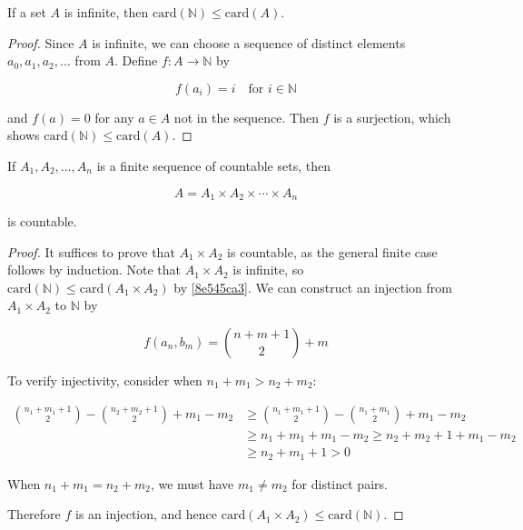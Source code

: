 \begin{thm}\label{8e545ca3}
    If a set $A$ is infinite, then $\mathrm{card}(\mathbb{N}) \le \mathrm{card}(A)$.
\end{thm}

\begin{proof}
    Since $A$ is infinite, we can choose a sequence of distinct elements $a_0,a_1,a_2,\ldots$ from $A$. 
    Define $f: A \to \mathbb{N}$ by

    \[
        f(a_i) = i \quad \text{for } i \in \mathbb{N}
    \]
    
    and $f(a) = 0$ for any $a \in A$ not in the sequence. Then $f$ is a surjection, 
    which shows $\mathrm{card}(\mathbb{N}) \le \mathrm{card}(A)$.
\end{proof}

\begin{thm}
    If $A_1,A_2,\ldots, A_n$ is a finite sequence of countable sets, then

    \[
        A = A_1 \times A_2 \times \cdots \times A_n
    \]

    is countable.
\end{thm}

\begin{proof}
    It suffices to prove that $A_1 \times A_2$ is countable, as the general finite case follows by induction.
    Note that $A_1 \times A_2$ is infinite, so $\mathrm{card}(\mathbb{N}) \le \mathrm{card}(A_1 \times A_2)$ by \cref{8e545ca3}.
    We can construct an injection from $A_1 \times A_2$ to $\mathbb{N}$ by

    \[
        f(a_n, b_m) = \binom{n+m + 1}{2} + m
    \]

    To verify injectivity, consider when $n_1 + m_1 > n_2 + m_2$:

    \begin{align*}
        \binom{n_1 + m_1 + 1}{2} -\binom{n_2 + m_2 + 1}{2} + m_1 - m_2 & \ge \binom{n_1 + m_1+1}{2} -\binom{n_1 + m_1}{2} + m_1 - m_2 \\
        & \ge n_1 + m_1  + m_1 - m_2 \ge n_2 + m_2  + 1 + m_1 - m_2 \\
        & \ge n_2 + m_1 +1 > 0
    \end{align*}

    When $n_1 + m_1 = n_2 + m_2$, we must have $m_1 \ne m_2$ for distinct pairs.

    Therefore $f$ is an injection, and hence $\mathrm{card}(A_1 \times A_2) \le \mathrm{card}(\mathbb{N})$.
\end{proof}

